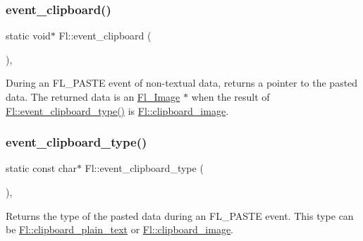 \subsubsection{\texorpdfstring{event\+\_\+clipboard()}{event\_clipboard()}}
{\footnotesize\ttfamily static void$\ast$ Fl\+::event\+\_\+clipboard (\begin{DoxyParamCaption}{ }\end{DoxyParamCaption})\hspace{0.3cm}{\ttfamily [inline]}, {\ttfamily [static]}}

During an F\+L\+\_\+\+P\+A\+S\+TE event of non-\/textual data, returns a pointer to the pasted data. The returned data is an \hyperlink{class_fl___image}{Fl\+\_\+\+Image} $\ast$ when the result of \hyperlink{group__fl__events_ga4c229daff88166ff492b1332c1568899}{Fl\+::event\+\_\+clipboard\+\_\+type()} is \hyperlink{group__fl__clipboard_gae37fa003534c8cc9a84b66a7040ddfcb}{Fl\+::clipboard\+\_\+image}. \mbox{\label{group__fl__events_ga4c229daff88166ff492b1332c1568899}} 
\subsubsection{\texorpdfstring{event\+\_\+clipboard\+\_\+type()}{event\_clipboard\_type()}}
{\footnotesize\ttfamily static const char$\ast$ Fl\+::event\+\_\+clipboard\+\_\+type (\begin{DoxyParamCaption}{ }\end{DoxyParamCaption})\hspace{0.3cm}{\ttfamily [inline]}, {\ttfamily [static]}}

Returns the type of the pasted data during an F\+L\+\_\+\+P\+A\+S\+TE event. This type can be \hyperlink{group__fl__clipboard_gae43ed653c1d222930510ad8042b55536}{Fl\+::clipboard\+\_\+plain\+\_\+text} or \hyperlink{group__fl__clipboard_gae37fa003534c8cc9a84b66a7040ddfcb}{Fl\+::clipboard\+\_\+image}. \mbox{\label{group__fl__events_ga73da625a4d77f730da5e0bd0e8823be9}} 
